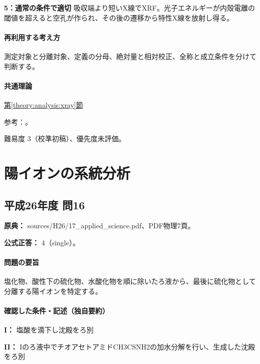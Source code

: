 \noindent\textbf{5：通常の条件で適切} 吸収端より短いX線でXRF。光子エネルギーが内殻電離の閾値を超えると空孔が作られ、その後の遷移から特性X線を放射し得る。\par

\paragraph{再利用する考え方} 測定対象と分離対象、定義の分母、絶対量と相対校正、全称と成立条件を分けて判断する。

\paragraph{共通理論} \hyperref[theory:analysis:xray]{第\ref*{theory:analysis:xray}節}

\par 参考：\cite{analysis49_xps_ref,analysis49_esr_ref,atomic_ir_raman}。

\par 難易度 3（校準初稿）、優先度未評価。

\section{陽イオンの系統分析}

\subsection{平成26年度 問16}
\label{q:h26-reg-applied-16}

\noindent\textbf{原典：} sources/H26/17\_applied\_science.pdf、PDF物理7頁。

\textbf{公式正答：} 4（single）。

\paragraph{問題の要旨} 塩化物、酸性下の硫化物、水酸化物を順に除いたろ液から、最後に硫化物として分離する陽イオンを特定する。

\paragraph{確認した条件・記述（独自要約）}\mbox{}\par

\noindent\textbf{I：} 塩酸を滴下し沈殿をろ別\par

\noindent\textbf{II：} Iのろ液中でチオアセトアミドCH3CSNH2の加水分解を行い、生成した沈殿をろ別\par


